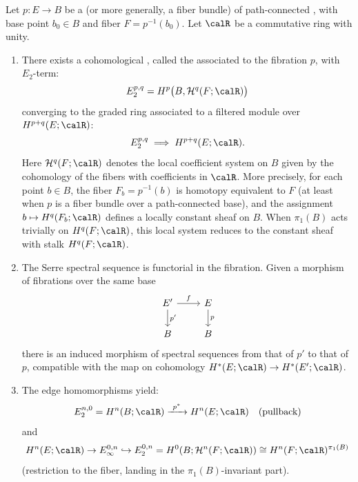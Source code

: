 \begin{definition} \label{definition:serre_spectral_sequence}

Let $p: E \to B$ be a  (or more generally, a fiber bundle) of path-connected , with base point $b_0 \in B$ and fiber $F = p^{-1}(b_0)$. Let $\calR$ be a commutative ring with unity.

\begin{enumerate}
    \item There exists a cohomological , called the  associated to the fibration $p$, with $E_2$-term:
    $$ E_2^{p,q} = H^p\bigl(B, \mathcal{H}^q(F; \calR)\bigr) $$
    converging to the graded ring associated to a filtered module over $H^{p+q}(E; \calR)$:
    $$ E_2^{p,q} \implies H^{p+q}(E; \calR). $$
    Here $\mathcal{H}^q(F; \calR)$ denotes the local coefficient system on $B$ given by the cohomology of the fibers with coefficients in $\calR$. More precisely, for each point $b \in B$, the fiber $F_b = p^{-1}(b)$ is homotopy equivalent to $F$ (at least when $p$ is a fiber bundle over a path-connected base), and the assignment $b \mapsto H^q(F_b; \calR)$ defines a locally constant sheaf on $B$. When $\pi_1(B)$ acts trivially on $H^q(F; \calR)$, this local system reduces to the constant sheaf with stalk $H^q(F; \calR)$.

    \item The Serre spectral sequence is functorial in the fibration. Given a morphism of fibrations over the same base
    $$
    \begin{tikzcd}
    E' \arrow[r, "f"] \arrow[d, "p'"] & E \arrow[d, "p"] \\
    B \arrow[Rightarrow, equal] & B
    \end{tikzcd}
    $$
    there is an induced morphism of spectral sequences from that of $p'$ to that of $p$, compatible with the map on cohomology $H^*(E; \calR) \to H^*(E'; \calR)$.

    \item The edge homomorphisms yield:
    $$ E_2^{n,0} = H^n(B; \calR) \xrightarrow{\ p^*\ } H^n(E; \calR) \quad \text{(pullback)} $$
    and
    $$ H^n(E; \calR) \to E_\infty^{0,n} \hookrightarrow E_2^{0,n} = H^0(B; \mathcal{H}^n(F; \calR)) \cong H^n(F; \calR)^{\pi_1(B)} $$
    (restriction to the fiber, landing in the $\pi_1(B)$-invariant part).


\end{enumerate}
\end{definition}
